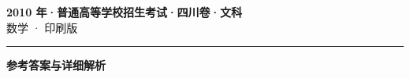 \documentclass[zihao=5, a4paper]{ctexart}
\begin{document}
\begin{center}
  {\Large\bfseries 2010 年·普通高等学校招生考试·四川卷·文科}\\[4pt]
  {\large 数学 · 印刷版}
\end{center}
\medskip
{}

\par\bigskip\hrule\bigskip
{}
\begin{center}{\large\bfseries 参考答案与详细解析}\end{center}
\smallskip

\end{document}
